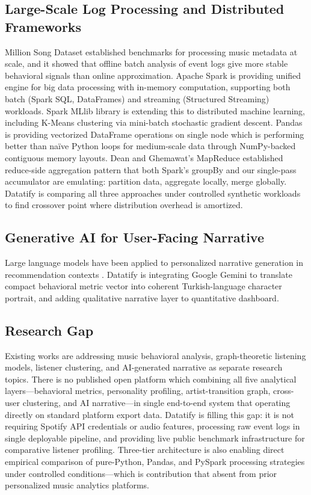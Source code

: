 \documentclass[conference]{IEEEtran}
\begin{document}
\subsection{Large-Scale Log Processing and Distributed Frameworks}

Million Song Dataset \cite{bertin2011million} established benchmarks for processing music metadata at scale, and it showed that offline batch analysis of event logs give more stable behavioral signals than online approximation. Apache Spark \cite{zaharia2016apache} is providing unified engine for big data processing with in-memory computation, supporting both batch (Spark SQL, DataFrames) and streaming (Structured Streaming) workloads. Spark MLlib library is extending this to distributed machine learning, including K-Means clustering via mini-batch stochastic gradient descent. Pandas \cite{mckinney2010data} is providing vectorized DataFrame operations on single node which is performing better than naïve Python loops for medium-scale data through NumPy-backed contiguous memory layouts. Dean and Ghemawat's MapReduce \cite{dean2008mapreduce} established reduce-side aggregation pattern that both Spark's groupBy and our single-pass accumulator are emulating: partition data, aggregate locally, merge globally. Datatify is comparing all three approaches under controlled synthetic workloads to find crossover point where distribution overhead is amortized.

\subsection{Generative AI for User-Facing Narrative}

Large language models have been applied to personalized narrative generation in recommendation contexts \cite{li2023gpt4rec}. Datatify is integrating Google Gemini to translate compact behavioral metric vector into coherent Turkish-language character portrait, and adding qualitative narrative layer to quantitative dashboard.

\subsection{Research Gap}

Existing works are addressing music behavioral analysis, graph-theoretic listening models, listener clustering, and AI-generated narrative as separate research topics. There is no published open platform which combining all five analytical layers---behavioral metrics, personality profiling, artist-transition graph, cross-user clustering, and AI narrative---in single end-to-end system that operating directly on standard platform export data. Datatify is filling this gap: it is not requiring Spotify API credentials or audio features, processing raw event logs in single deployable pipeline, and providing live public benchmark infrastructure for comparative listener profiling. Three-tier architecture is also enabling direct empirical comparison of pure-Python, Pandas, and PySpark processing strategies under controlled conditions---which is contribution that absent from prior personalized music analytics platforms.
\end{document}
